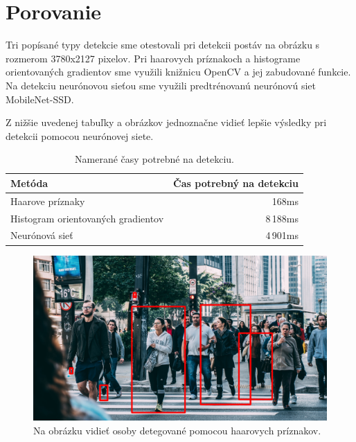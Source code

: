 \section{Porovanie}
Tri popísané typy detekcie sme otestovali pri detekcii postáv na obrázku s rozmerom 3780x2127 pixelov.
Pri haarovych príznakoch a histograme orientovaných gradientov sme využili knižnicu OpenCV a jej zabudované funkcie.
Na detekciu neurónovou sieťou sme využili predtrénovanú neurónovú siet MobileNet-SSD.

Z nižšie uvedenej tabuľky a obrázkov jednoznačne vidieť lepšie výsledky pri detekcii pomocou neurónovej siete.



\begin{table}[H]
\begin{center}
\caption[Namerané časy detekcie]{Namerané časy potrebné na detekciu.}
\begin{tabular}{ |l|r| } 
  \hline
 {Metóda} & {Čas potrebný na detekciu} \\ [0.5ex] 
 \hline
 Haarove príznaky & 168ms \\ 
 Histogram orientovaných gradientov & 8\,188ms \\ 
 Neurónová sieť & 4\,901ms \\ 
 \hline
\end{tabular}
\end{center}
\end{table}


\begin{figure}[H]
\centerline{\includegraphics[width=1\textwidth]{images/detect_haar}}
\caption[Detekcia pomocou haarovych príznakov]{Na obrázku vidieť osoby detegované pomocou haarovych príznakov.}
\label{obr:detect_haar}
\end{figure}

